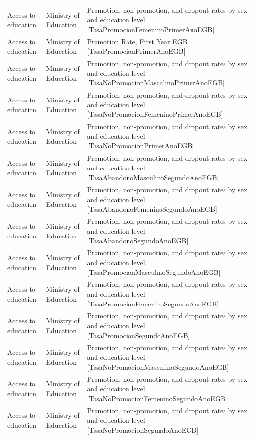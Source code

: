 \documentclass[10pt,a4paper]{article}
\begin{document}
\begin{longtable}{@{}>{\raggedright\arraybackslash}p{3.5cm}>{\raggedright\arraybackslash}p{5.6cm}>{\raggedright\arraybackslash}p{\dimexpr\textwidth-9.1cm-4\tabcolsep\relax}@{}}
Access to education & Ministry of Education & Promotion, non-promotion, and dropout rates by sex and education level [TasaPromocionFemeninoPrimerAnoEGB]\\
Access to education & Ministry of Education & Promotion Rate, First Year EGB [TasaPromocionPrimerAnoEGB]\\
Access to education & Ministry of Education & Promotion, non-promotion, and dropout rates by sex and education level [TasaNoPromocionMasculinoPrimerAnoEGB]\\
Access to education & Ministry of Education & Promotion, non-promotion, and dropout rates by sex and education level [TasaNoPromocionFemeninoPrimerAnoEGB]\\
Access to education & Ministry of Education & Promotion, non-promotion, and dropout rates by sex and education level [TasaNoPromocionPrimerAnoEGB]\\
Access to education & Ministry of Education & Promotion, non-promotion, and dropout rates by sex and education level [TasaAbandonoMasculinoSegundoAnoEGB]\\
Access to education & Ministry of Education & Promotion, non-promotion, and dropout rates by sex and education level [TasaAbandonoFemeninoSegundoAnoEGB]\\
Access to education & Ministry of Education & Promotion, non-promotion, and dropout rates by sex and education level [TasaAbandonoSegundoAnoEGB]\\
Access to education & Ministry of Education & Promotion, non-promotion, and dropout rates by sex and education level [TasaPromocionMasculinoSegundoAnoEGB]\\
Access to education & Ministry of Education & Promotion, non-promotion, and dropout rates by sex and education level [TasaPromocionFemeninoSegundoAnoEGB]\\
Access to education & Ministry of Education & Promotion, non-promotion, and dropout rates by sex and education level [TasaPromocionSegundoAnoEGB]\\
Access to education & Ministry of Education & Promotion, non-promotion, and dropout rates by sex and education level [TasaNoPromocionMasculinoSegundoAnoEGB]\\
Access to education & Ministry of Education & Promotion, non-promotion, and dropout rates by sex and education level [TasaNoPromocionFemeninoSegundoAnoEGB]\\
Access to education & Ministry of Education & Promotion, non-promotion, and dropout rates by sex and education level [TasaNoPromocionSegundoAnoEGB]\\

\end{longtable}
\end{document}
